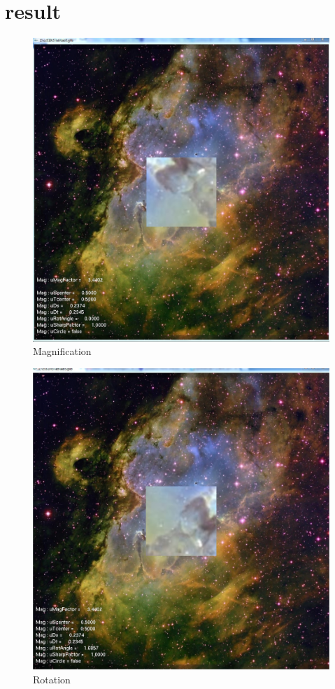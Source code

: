 \documentclass[12pt,letterpaper]{article}
\begin{document}
\section{result}

\begin{figure}[p]
    \centering
    \includegraphics[width=1.0\textwidth]{1.jpg}
    \caption{Magnification}
\end{figure}

\begin{figure}[p]
    \centering
    \includegraphics[width=1.0\textwidth]{2.jpg}
    \caption{Rotation}
\end{figure}
\end{document}
